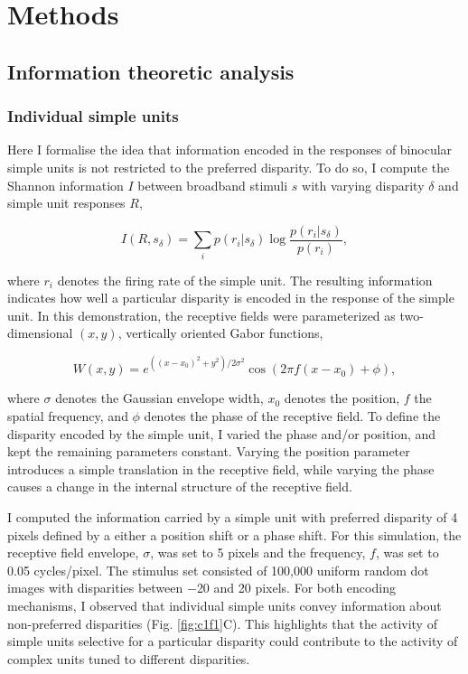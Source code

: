 \section{Methods}

\subsection*{Information theoretic analysis}

\subsubsection*{Individual simple units}
Here I formalise the idea that information encoded in the responses of binocular simple units is not restricted to the preferred disparity. To do so, I compute the Shannon information $I$ between broadband stimuli $s$ with varying disparity $\delta$ and simple unit responses $R$,

\begin{equation}
  I(R, s_\delta) = \sum_i p(r_i|s_\delta) \log \frac{p(r_i|s_\delta)}{p(r_i)},
  \label{eq:ShannonInformation}
\end{equation}
 
where $r_i$ denotes the firing rate of the simple unit. The resulting information indicates how well a particular disparity is encoded in the response of the simple unit. In this demonstration, the receptive fields were parameterized as two-dimensional $(x,y)$, vertically oriented Gabor functions,

\begin{equation}
  W(x,y) = e^{((x-x_0)^2 + y^2)/2\sigma^2} \cos (2 \pi f (x-x_0) + \phi),
\end{equation}

where $\sigma$ denotes the Gaussian envelope width, $x_0$ denotes the position, $f$ the spatial frequency, and $\phi$ denotes the phase of the receptive field. To define the disparity encoded by the simple unit, I varied the phase and/or position, and kept the remaining parameters constant. Varying the position parameter introduces a simple translation in the receptive field, while varying the phase causes a change in the internal structure of the receptive field. 

I computed the information carried by a simple unit with preferred disparity of 4 pixels defined by a either a position shift or a phase shift. For this simulation, the receptive field envelope, $\sigma$, was set to 5 pixels and the frequency, $f$, was set to 0.05 cycles/pixel. The stimulus set consisted of 100,000 uniform random dot images with disparities between $-$20 and 20 pixels. For both encoding mechanisms, I observed that individual simple units convey information about non-preferred disparities (Fig. \ref{fig:c1f1}C). This highlights that the activity of simple units selective for a particular disparity could contribute to the activity of complex units tuned to different disparities.

